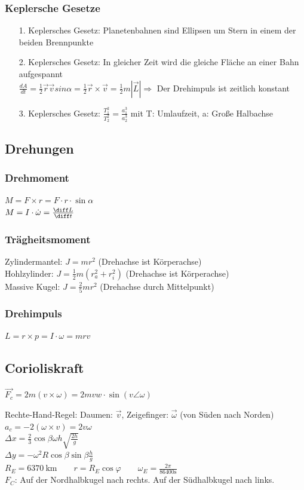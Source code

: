 \documentclass[german]{latex4ei/latex4ei_sheet}
\begin{document}
\subsubsection{Keplersche Gesetze}
\begin{sectionbox}
\begin{itemize}
\item[1.] Keplersches Gesetz: Planetenbahnen sind Ellipsen um Stern in einem der beiden Brennpunkte
\item[2.] Keplersches Gesetz: In gleicher Zeit wird die gleiche Fläche an einer Bahn aufgespannt\\$\frac{dA}{dt} = \frac{1}{2} \vec {r} \vec {v} sin \alpha = \frac{1}{2}\vec {r} \times \vec {v} = \frac{1}{2}m|\vec {L}| \Rightarrow$ Der Drehimpuls ist zeitlich konstant
\item[3.] Keplersches Gesetz: $\frac{T_1^2}{T_2^2} = \frac{a_1^3}{a_2^3}$ mit T: Umlaufzeit, a: Große Halbachse
\end{itemize}
\end{sectionbox}
\subsection{Drehungen}
\subsubsection{Drehmoment}
$M=F\times r=F\cdot r\cdot \sin \alpha$\\
$M=I\cdot \dot{\omega}=\frac{\diff L}{\diff t}$
\subsubsection{Trägheitsmoment}
Zylindermantel: $J = mr^2$ (Drehachse ist Körperachse)\\
Hohlzylinder: $J = \frac{1}{2}m(r_a^2+r_i^2)$ (Drehachse ist Körperachse)\\
Massive Kugel: $J = \frac{2}{5}mr^2$ (Drehachse durch Mittelpunkt)\\
\subsubsection{Drehimpuls}
$L=r\times p=I\cdot \omega = mrv$
\subsection{Corioliskraft}
\begin{emphbox}
$\vec{F_c}=2m(v\times \omega)= 2m v w \cdot \sin{(v\angle \omega)}$
\end{emphbox}
Rechte-Hand-Regel: Daumen: $\vec{v}$, Zeigefinger: $\vec{\omega}$ (von Süden nach Norden)\\
$a_c=-2(\omega \times v)=2v\omega$\\
$\Delta x= \frac{2}{3}\cos \beta \omega h \sqrt{\frac{2h}{g}}$\\
$\Delta y = -\omega^2R\cos \beta \sin \beta \frac{h}{g}$\\
$R_E=\SI{6370}{\kilo \meter} \qquad r=R_E \cos \varphi \qquad \omega_E=\frac{2\pi}{86400\si{\second}}$\\
$F_C$: Auf der Nordhalbkugel nach rechts. Auf der Südhalbkugel nach links.
\end{document}
